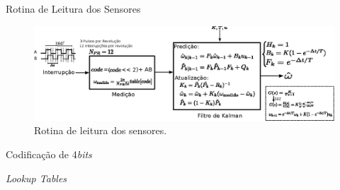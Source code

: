 \begin{frame}{Rotina de Leitura dos Sensores}
    
    \begin{figure}
        \centering
        \includegraphics[width=\textwidth]{figuras/ilustracoes/rotina_leitura_dos_sensores.eps}
        \caption{Rotina de leitura dos sensores.}
    \end{figure}
    
\end{frame}

\begin{frame}{Codificação de 4\emph{bits}}
    
    
\end{frame}

\begin{frame}{\emph{Lookup Tables}}
    
    
\end{frame}